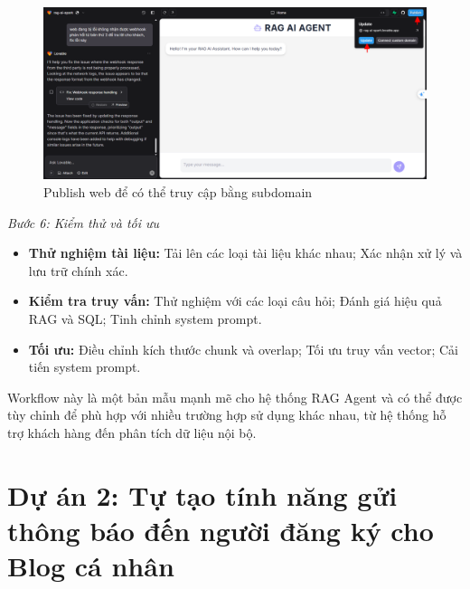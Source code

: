     \begin{figure}[H]
    \centering
    \includegraphics[width=1\textwidth]{images/1rag03.pdf}
    \caption{Publish web để có thể truy cập bằng subdomain}
    \end{figure}
    


\textit{Bước 6: Kiểm thử và tối ưu}
\begin{itemize}
    \item \textbf{Thử nghiệm tài liệu:} Tải lên các loại tài liệu khác nhau; Xác nhận xử lý và lưu trữ chính xác.
    
    \item \textbf{Kiểm tra truy vấn:} Thử nghiệm với các loại câu hỏi; Đánh giá hiệu quả RAG và SQL; Tinh chỉnh system prompt.
    
    \item \textbf{Tối ưu:} Điều chỉnh kích thước chunk và overlap; Tối ưu truy vấn vector; Cải tiến system prompt.
\end{itemize}



Workflow này là một bản mẫu mạnh mẽ cho hệ thống RAG Agent và có thể được tùy chỉnh để phù hợp với nhiều trường hợp sử dụng khác nhau, từ hệ thống hỗ trợ khách hàng đến phân tích dữ liệu nội bộ.\\



\newpage

\clearpage

\section{\textbf{Dự án 2: Tự tạo tính năng gửi thông báo đến người đăng ký cho Blog cá nhân}}


